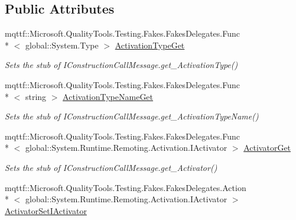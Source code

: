 \subsection*{Public Attributes}
\begin{DoxyCompactItemize}
\item 
mqttf\-::\-Microsoft.\-Quality\-Tools.\-Testing.\-Fakes.\-Fakes\-Delegates.\-Func\\*
$<$ global\-::\-System.\-Type $>$ \hyperlink{class_system_1_1_runtime_1_1_remoting_1_1_activation_1_1_fakes_1_1_stub_i_construction_call_message_ae33336098a6010834bffd650d8c9a542}{Activation\-Type\-Get}
\begin{DoxyCompactList}\small\item\em Sets the stub of I\-Construction\-Call\-Message.\-get\-\_\-\-Activation\-Type()\end{DoxyCompactList}\item 
mqttf\-::\-Microsoft.\-Quality\-Tools.\-Testing.\-Fakes.\-Fakes\-Delegates.\-Func\\*
$<$ string $>$ \hyperlink{class_system_1_1_runtime_1_1_remoting_1_1_activation_1_1_fakes_1_1_stub_i_construction_call_message_a7e105d2bdb44f5a4853c8695df76c2ae}{Activation\-Type\-Name\-Get}
\begin{DoxyCompactList}\small\item\em Sets the stub of I\-Construction\-Call\-Message.\-get\-\_\-\-Activation\-Type\-Name()\end{DoxyCompactList}\item 
mqttf\-::\-Microsoft.\-Quality\-Tools.\-Testing.\-Fakes.\-Fakes\-Delegates.\-Func\\*
$<$ global\-::\-System.\-Runtime.\-Remoting.\-Activation.\-I\-Activator $>$ \hyperlink{class_system_1_1_runtime_1_1_remoting_1_1_activation_1_1_fakes_1_1_stub_i_construction_call_message_a2902aa62464f06db5f47aa8406d03d38}{Activator\-Get}
\begin{DoxyCompactList}\small\item\em Sets the stub of I\-Construction\-Call\-Message.\-get\-\_\-\-Activator()\end{DoxyCompactList}\item 
mqttf\-::\-Microsoft.\-Quality\-Tools.\-Testing.\-Fakes.\-Fakes\-Delegates.\-Action\\*
$<$ global\-::\-System.\-Runtime.\-Remoting.\-Activation.\-I\-Activator $>$ \hyperlink{class_system_1_1_runtime_1_1_remoting_1_1_activation_1_1_fakes_1_1_stub_i_construction_call_message_a8745f091b8f45bd5f4ac17a586e735ad}{Activator\-Set\-I\-Activator}

\end{DoxyCompactItemize}
